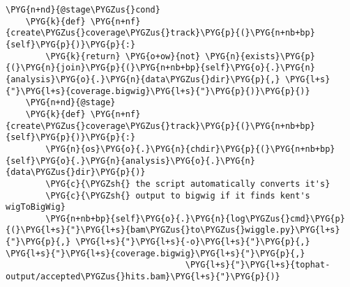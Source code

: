 \begin{Verbatim}[commandchars=\\\{\}]
    \PYG{n+nd}{@stage\PYGZus{}cond}
    \PYG{k}{def} \PYG{n+nf}{create\PYGZus{}coverage\PYGZus{}track}\PYG{p}{(}\PYG{n+nb+bp}{self}\PYG{p}{)}\PYG{p}{:}
        \PYG{k}{return} \PYG{o+ow}{not} \PYG{n}{exists}\PYG{p}{(}\PYG{n}{join}\PYG{p}{(}\PYG{n+nb+bp}{self}\PYG{o}{.}\PYG{n}{analysis}\PYG{o}{.}\PYG{n}{data\PYGZus{}dir}\PYG{p}{,} \PYG{l+s}{"}\PYG{l+s}{coverage.bigwig}\PYG{l+s}{"}\PYG{p}{)}\PYG{p}{)}
    \PYG{n+nd}{@stage}
    \PYG{k}{def} \PYG{n+nf}{create\PYGZus{}coverage\PYGZus{}track}\PYG{p}{(}\PYG{n+nb+bp}{self}\PYG{p}{)}\PYG{p}{:}
        \PYG{n}{os}\PYG{o}{.}\PYG{n}{chdir}\PYG{p}{(}\PYG{n+nb+bp}{self}\PYG{o}{.}\PYG{n}{analysis}\PYG{o}{.}\PYG{n}{data\PYGZus{}dir}\PYG{p}{)}
        \PYG{c}{\PYGZsh{} the script automatically converts it's}
        \PYG{c}{\PYGZsh{} output to bigwig if it finds kent's wigToBigWig}
        \PYG{n+nb+bp}{self}\PYG{o}{.}\PYG{n}{log\PYGZus{}cmd}\PYG{p}{(}\PYG{l+s}{"}\PYG{l+s}{bam\PYGZus{}to\PYGZus{}wiggle.py}\PYG{l+s}{"}\PYG{p}{,} \PYG{l+s}{"}\PYG{l+s}{-o}\PYG{l+s}{"}\PYG{p}{,} \PYG{l+s}{"}\PYG{l+s}{coverage.bigwig}\PYG{l+s}{"}\PYG{p}{,}
                                    \PYG{l+s}{"}\PYG{l+s}{tophat-output/accepted\PYGZus{}hits.bam}\PYG{l+s}{"}\PYG{p}{)}


\end{Verbatim}
